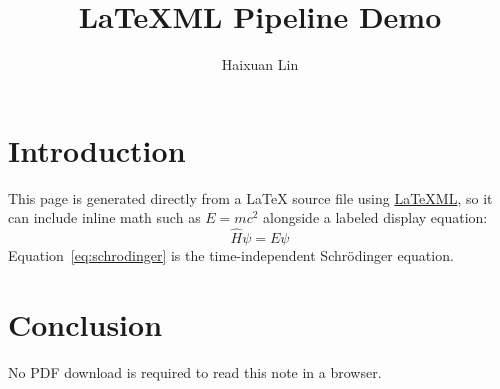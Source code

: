 \documentclass{article}
\title{LaTeXML Pipeline Demo}
\author{Haixuan Lin}
\date{}
\begin{document}
\maketitle

\section{Introduction}
This page is generated directly from a \LaTeX{} source file using
\href{https://dlmf.nist.gov/LaTeXML/}{LaTeXML}, so it can include inline
math such as $E = mc^2$ alongside a labeled display equation:
\begin{equation}
  \hat{H} \psi = E \psi
  \label{eq:schrodinger}
\end{equation}
Equation~\eqref{eq:schrodinger} is the time-independent Schr\"odinger
equation.

\section{Conclusion}
No PDF download is required to read this note in a browser.
\end{document}
